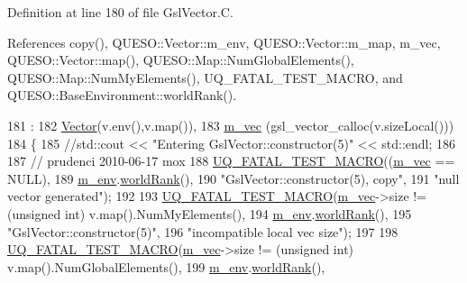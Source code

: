 Definition at line 180 of file Gsl\-Vector.\-C.



References copy(), Q\-U\-E\-S\-O\-::\-Vector\-::m\-\_\-env, Q\-U\-E\-S\-O\-::\-Vector\-::m\-\_\-map, m\-\_\-vec, Q\-U\-E\-S\-O\-::\-Vector\-::map(), Q\-U\-E\-S\-O\-::\-Map\-::\-Num\-Global\-Elements(), Q\-U\-E\-S\-O\-::\-Map\-::\-Num\-My\-Elements(), U\-Q\-\_\-\-F\-A\-T\-A\-L\-\_\-\-T\-E\-S\-T\-\_\-\-M\-A\-C\-R\-O, and Q\-U\-E\-S\-O\-::\-Base\-Environment\-::world\-Rank().


\begin{DoxyCode}
181   :
182   \hyperlink{class_q_u_e_s_o_1_1_vector_aff103391923777d30d67f3d89706278b}{Vector}(v.env(),v.map()),
183   \hyperlink{class_q_u_e_s_o_1_1_gsl_vector_a503dd126017b7ac587ff511e8d0d833b}{m\_vec}        (gsl\_vector\_calloc(v.sizeLocal()))
184 \{
185   \textcolor{comment}{//std::cout << "Entering GslVector::constructor(5)" << std::endl;}
186 
187   \textcolor{comment}{// prudenci 2010-06-17 mox}
188   \hyperlink{_defines_8h_a56d63d18d0a6d45757de47fcc06f574d}{UQ\_FATAL\_TEST\_MACRO}((\hyperlink{class_q_u_e_s_o_1_1_gsl_vector_a503dd126017b7ac587ff511e8d0d833b}{m\_vec} == NULL),
189                       \hyperlink{class_q_u_e_s_o_1_1_vector_ae7615172bb1e54339151d3f3d71a0344}{m\_env}.\hyperlink{class_q_u_e_s_o_1_1_base_environment_a78b57112bbd0e6dd0e8afec00b40ffa7}{worldRank}(),
190                       \textcolor{stringliteral}{"GslVector::constructor(5), copy"},
191                       \textcolor{stringliteral}{"null vector generated"});
192 
193   \hyperlink{_defines_8h_a56d63d18d0a6d45757de47fcc06f574d}{UQ\_FATAL\_TEST\_MACRO}(\hyperlink{class_q_u_e_s_o_1_1_gsl_vector_a503dd126017b7ac587ff511e8d0d833b}{m\_vec}->size != (\textcolor{keywordtype}{unsigned} \textcolor{keywordtype}{int}) v.map().NumMyElements(),
194                       \hyperlink{class_q_u_e_s_o_1_1_vector_ae7615172bb1e54339151d3f3d71a0344}{m\_env}.\hyperlink{class_q_u_e_s_o_1_1_base_environment_a78b57112bbd0e6dd0e8afec00b40ffa7}{worldRank}(),
195                       \textcolor{stringliteral}{"GslVector::constructor(5)"},
196                       \textcolor{stringliteral}{"incompatible local vec size"});
197 
198   \hyperlink{_defines_8h_a56d63d18d0a6d45757de47fcc06f574d}{UQ\_FATAL\_TEST\_MACRO}(\hyperlink{class_q_u_e_s_o_1_1_gsl_vector_a503dd126017b7ac587ff511e8d0d833b}{m\_vec}->size != (\textcolor{keywordtype}{unsigned} \textcolor{keywordtype}{int}) v.map().NumGlobalElements(),
199                       \hyperlink{class_q_u_e_s_o_1_1_vector_ae7615172bb1e54339151d3f3d71a0344}{m\_env}.\hyperlink{class_q_u_e_s_o_1_1_base_environment_a78b57112bbd0e6dd0e8afec00b40ffa7}{worldRank}(),

\end{DoxyCode}
